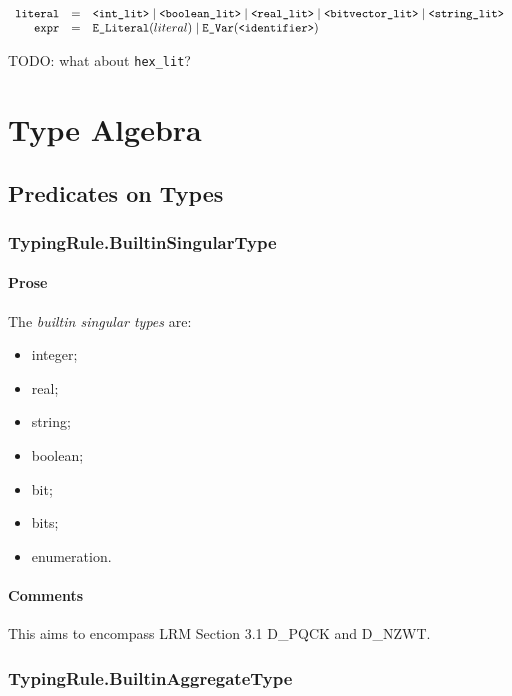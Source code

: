 \documentclass{book}
\begin{document}
\[
\begin{array}{rcl}
\texttt{literal} &=& \texttt{<int\_lit>} \;|\; \texttt{<boolean\_lit>} \;|\; \texttt{<real\_lit>} \;|\; \texttt{<bitvector\_lit>} \;|\; \texttt{<string\_lit>}\\
\texttt{expr} &=& \texttt{E\_Literal}(literal) \;|\; \texttt{E\_Var}(\texttt{<identifier>})
\end{array}
\]

TODO: what about \texttt{hex\_lit}?

\chapter{Type Algebra}

\section{Predicates on Types}

\subsection{TypingRule.BuiltinSingularType \label{sec:TypingRule.BuiltinSingularType}}

    \subsubsection{Prose}
    The \emph{builtin singular types} are:
    \begin{itemize}
    \item  integer; 
    \item  real;
    \item  string; 
    \item  boolean; 
    \item  bit;
    \item  bits;
    \item  enumeration.
    \end{itemize}

    \subsubsection{Comments}
    This aims to encompass LRM Section 3.1 D\_PQCK and D\_NZWT.

\subsection{TypingRule.BuiltinAggregateType \label{sec:TypingRule.BuiltinAggregateType}}
\end{document}
